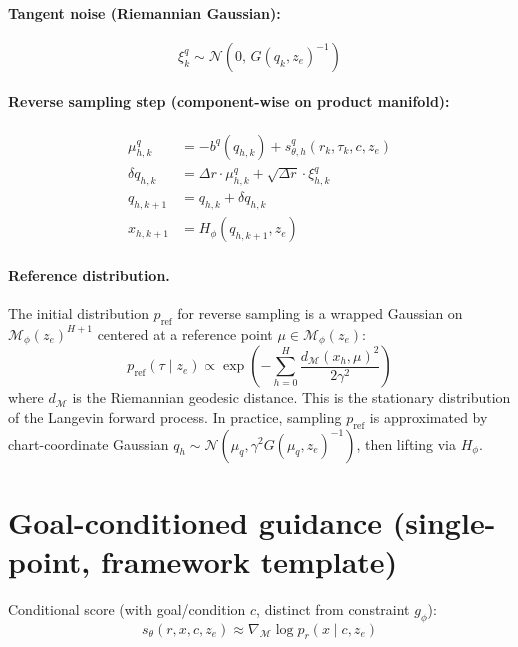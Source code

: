\documentclass[11pt,a4paper]{article}
\newcommand{\N}{\mathcal{N}}
\newcommand{\Mphi}{\mathcal{M}_{\phi}}
\newcommand{\Mset}{\mathcal{M}}
\begin{document}
\paragraph{Tangent noise (Riemannian Gaussian):}
\begin{equation}
\xi_k^q \sim \N(0, \, G(q_k, z_e)^{-1})
\end{equation}

\paragraph{Reverse sampling step (component-wise on product manifold):}
\begin{align}
\mu_{h, k}^q &= -b^q(q_{h, k}) + s_{\theta, h}^q(r_k, \tau_k, c, z_e) \\
\delta q_{h, k} &= \Delta r \cdot \mu_{h, k}^q + \sqrt{\Delta r} \cdot \xi_{h, k}^q \\
q_{h, k+1} &= q_{h, k} + \delta q_{h, k} \\
x_{h, k+1} &= H_\phi(q_{h, k+1}, z_e)
\end{align}

\paragraph{Reference distribution.} The initial distribution $p_{\text{ref}}$ for reverse sampling is a wrapped Gaussian on $\Mphi(z_e)^{H+1}$ centered at a reference point $\mu \in \Mphi(z_e)$:
\begin{equation}
p_{\text{ref}}(\tau \mid z_e) \propto \exp\left( -\sum_{h=0}^{H} \frac{d_{\Mset}(x_h, \mu)^2}{2 \gamma^2} \right)
\end{equation}
where $d_{\Mset}$ is the Riemannian geodesic distance. This is the stationary distribution of the Langevin forward process. In practice, sampling $p_{\text{ref}}$ is approximated by chart-coordinate Gaussian $q_h \sim \N(\mu_q, \gamma^2 G(\mu_q, z_e)^{-1})$, then lifting via $H_\phi$.

\section{Goal-conditioned guidance (single-point, framework template)}

Conditional score (with goal/condition $c$, distinct from constraint $g_\phi$):
\begin{equation}
s_\theta(r, x, c, z_e) \approx \nabla_{\Mset} \log p_r(x \mid c, z_e)
\end{equation}
\end{document}
